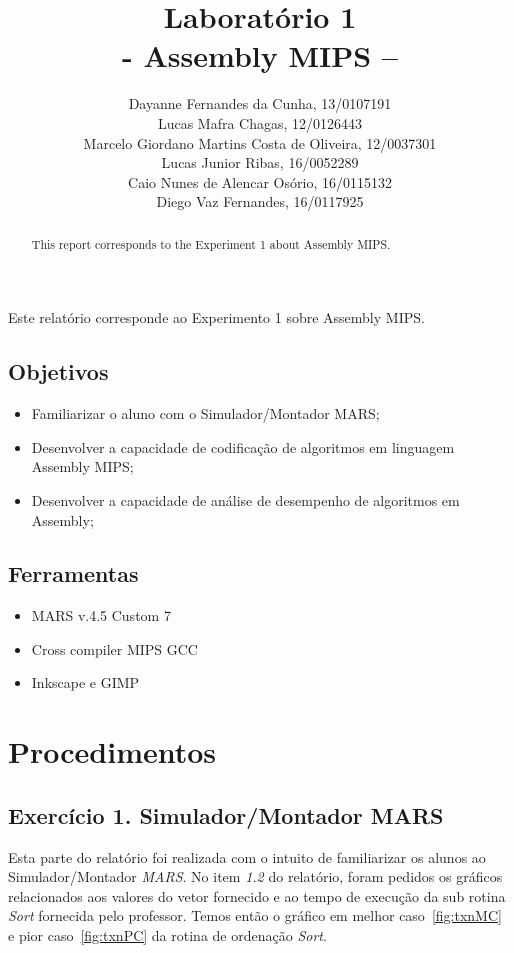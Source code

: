 \documentclass[12pt]{article}
\title{Laboratório 1\\- Assembly MIPS –}
\author{Dayanne Fernandes da Cunha, 13/0107191\\
  Lucas Mafra Chagas, 12/0126443\\
  Marcelo Giordano Martins Costa de Oliveira, 12/0037301\\
  Lucas Junior Ribas, 16/0052289\\
  Caio Nunes de Alencar Osório, 16/0115132\\
  Diego Vaz Fernandes, 16/0117925}
\begin{document}
\maketitle

 \begin{abstract}
	This report corresponds to the Experiment 1 about Assembly MIPS.
 \end{abstract}
 \begin{resumo}
	Este relatório corresponde ao Experimento 1 sobre Assembly MIPS.
 \end{resumo}

\subsection{Objetivos}
\label{sec:Objetivos}

\begin{itemize}
\item Familiarizar o aluno com o Simulador/Montador MARS;
\item Desenvolver a capacidade de codificação de algoritmos em linguagem Assembly MIPS;
\item Desenvolver a capacidade de análise de desempenho de algoritmos em Assembly;
\end{itemize}

\subsection{Ferramentas}
\label{sec:Materiais}

\begin{itemize}
\item MARS v.4.5 Custom 7
\item Cross compiler MIPS GCC
\item Inkscape e GIMP
\end{itemize}

\section{Procedimentos}
\label{sec:Procedimentos}

\subsection{Exercício 1. Simulador/Montador MARS}
\label{subsec:mars}

Esta parte do relatório foi realizada com o intuito de familiarizar os alunos ao Simulador/Montador \textit{MARS}. No item \textit{1.2} do relatório, foram pedidos os gráficos relacionados aos valores do vetor fornecido e ao tempo de execução da sub rotina \textit{Sort} fornecida pelo professor. Temos então o gráfico em melhor caso~\ref{fig:txnMC} e pior caso~\ref{fig:txnPC} da rotina de ordenação \textit{Sort}.
\end{document}
